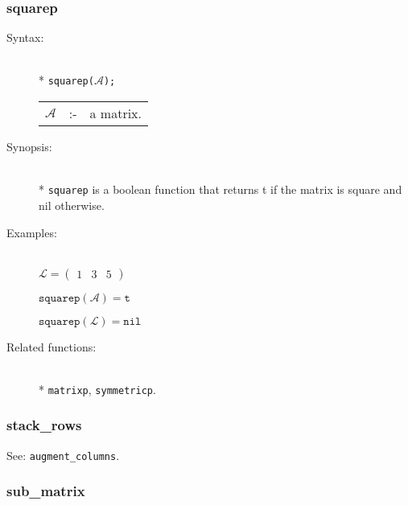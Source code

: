 \subsubsection{squarep}
\label{linalg:squarep}
\hypertarget{operator:SQUAREP}{}

\begin{description}
\item[Syntax:]\mbox{}\\*
\texttt{squarep($\mathcal{A}$);}\\[2mm]
\begin{tabular}{l l l}
$\mathcal{A}$ &:-& a matrix.
\end{tabular}

\item[Synopsis:]\mbox{}\\*
\texttt{squarep} is a boolean function that returns t if
                the matrix is square and nil otherwise.

\item[Examples:]\mbox{}\\
  \(\mathcal{L} = \begin{pmatrix} 1 & 3 & 5 \end{pmatrix}\)

  \(\texttt{squarep}(\mathcal{A}) = \texttt{t}\)

  \(\texttt{squarep}(\mathcal{L}) = \texttt{nil}\)

\item[Related functions:]\mbox{}\\*
\texttt{matrixp}, \texttt{symmetricp}.
\end{description}


\subsubsection{stack\_rows}
\label{linalg:stack_rows}
\hypertarget{operator:STACK_ROWS}{}

See: \texttt{augment\_columns}.


\subsubsection{sub\_matrix}
\label{linalg:sub_matrix}
\hypertarget{operator:SUB_MATRIX}{}

